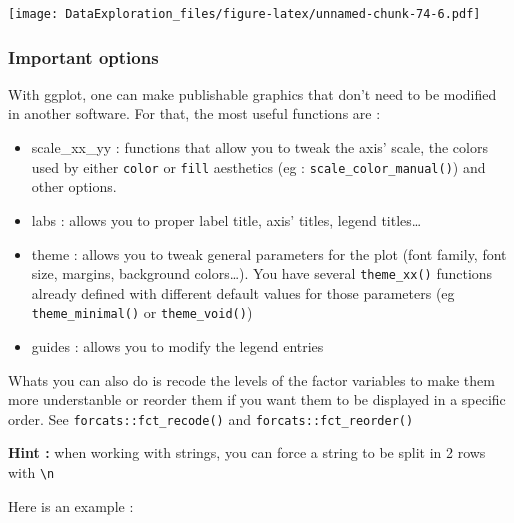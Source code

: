 \documentclass[
]{book}
\providecommand{\tightlist}{%
  \setlength{\itemsep}{0pt}\setlength{\parskip}{0pt}}
\begin{document}
\texttt{[image: DataExploration\_files/figure-latex/unnamed-chunk-74-6.pdf]}

\hypertarget{important-options}{%
\subsubsection{Important options}\label{important-options}}

With ggplot, one can make publishable graphics that don't need to be modified in another software. For that, the most useful functions are :

\begin{itemize}
\tightlist
\item
  scale\_xx\_yy : functions that allow you to tweak the axis' scale, the colors used by either \texttt{color} or \texttt{fill} aesthetics (eg : \texttt{scale\_color\_manual()}) and other options.
\item
  labs : allows you to proper label title, axis' titles, legend titles\ldots{}
\item
  theme : allows you to tweak general parameters for the plot (font family, font size, margins, background colors\ldots). You have several \texttt{theme\_xx()} functions already defined with different default values for those parameters (eg \texttt{theme\_minimal()} or \texttt{theme\_void()})
\item
  guides : allows you to modify the legend entries
\end{itemize}

Whats you can also do is recode the levels of the factor variables to make them more understanble or reorder them if you want them to be displayed in a specific order. See \texttt{forcats::fct\_recode()} and \texttt{forcats::fct\_reorder()}

\textbf{Hint :} when working with strings, you can force a string to be split in 2 rows with \texttt{\textbackslash{}n}

Here is an example :
\end{document}
